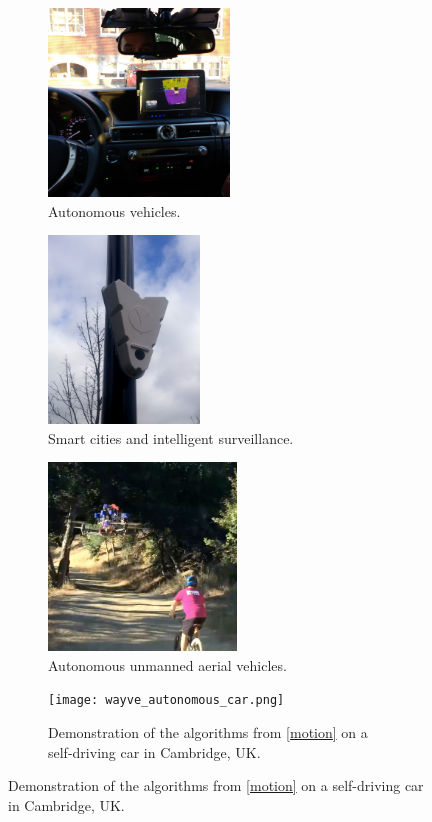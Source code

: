 \begin{figure}[pt]
\center
    \begin{subfigure}[t]{0.32\textwidth}
        \centering
          \includegraphics[height=5cm]{toyota.jpg}
        \caption{Autonomous vehicles.}
    \end{subfigure}
    \begin{subfigure}[t]{0.32\textwidth}
        \centering
          \includegraphics[height=5cm]{vivacity.jpg}
        \caption{Smart cities and intelligent surveillance.}
    \end{subfigure}
    \begin{subfigure}[t]{0.32\textwidth}
        \centering
          \includegraphics[height=5cm]{skydio.png}
        \caption{Autonomous unmanned aerial vehicles.}
    \end{subfigure}
    \begin{subfigure}[t]{0.98\textwidth}
        \centering
          \texttt{[image: wayve\_autonomous\_car.png]}
        \caption{Demonstration of the algorithms from \cref{motion} on a self-driving car in Cambridge, UK.}

\end{subfigure}
\end{figure}
